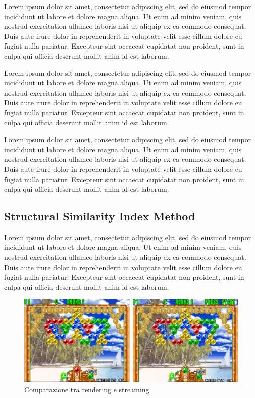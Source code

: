 Lorem ipsum dolor sit amet, consectetur adipiscing elit, sed do eiusmod tempor incididunt ut labore et dolore magna aliqua. Ut enim ad minim veniam, quis nostrud exercitation ullamco laboris nisi ut aliquip ex ea commodo consequat. Duis aute irure dolor in reprehenderit in voluptate velit esse cillum dolore eu fugiat nulla pariatur. Excepteur sint occaecat cupidatat non proident, sunt in culpa qui officia deserunt mollit anim id est laborum.

Lorem ipsum dolor sit amet, consectetur adipiscing elit, sed do eiusmod tempor incididunt ut labore et dolore magna aliqua. Ut enim ad minim veniam, quis nostrud exercitation ullamco laboris nisi ut aliquip ex ea commodo consequat. Duis aute irure dolor in reprehenderit in voluptate velit esse cillum dolore eu fugiat nulla pariatur. Excepteur sint occaecat cupidatat non proident, sunt in culpa qui officia deserunt mollit anim id est laborum.

Lorem ipsum dolor sit amet, consectetur adipiscing elit, sed do eiusmod tempor incididunt ut labore et dolore magna aliqua. Ut enim ad minim veniam, quis nostrud exercitation ullamco laboris nisi ut aliquip ex ea commodo consequat. Duis aute irure dolor in reprehenderit in voluptate velit esse cillum dolore eu fugiat nulla pariatur. Excepteur sint occaecat cupidatat non proident, sunt in culpa qui officia deserunt mollit anim id est laborum.


\subsection{Structural Similarity Index Method}
Lorem ipsum dolor sit amet, consectetur adipiscing elit, sed do eiusmod tempor incididunt ut labore et dolore magna aliqua. Ut enim ad minim veniam, quis nostrud exercitation ullamco laboris nisi ut aliquip ex ea commodo consequat. Duis aute irure dolor in reprehenderit in voluptate velit esse cillum dolore eu fugiat nulla pariatur. Excepteur sint occaecat cupidatat non proident, sunt in culpa qui officia deserunt mollit anim id est laborum.

\begin{figure}[H]
	\includegraphics[width=\linewidth]{immagini/puzzle_compare}
	\caption{Comparazione tra rendering e streaming}
	\label{fig:puzzle_compare}
\end{figure}


